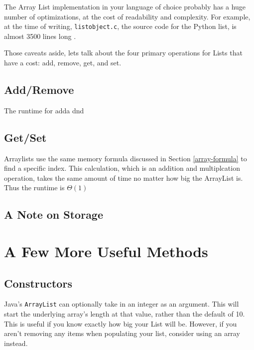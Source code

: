 The Array List implementation in your language of choice probably has a huge number of optimizations, at the cost of readability and complexity.  For example, at the time of writing, \texttt{listobject.c}, the source code for the Python list, is almost 3500 lines long \cite{py-list-source}.

Those caveats aside, lets talk about the four primary operations for Lists that have a cost: add, remove, get, and set.


\subsection{Add/Remove}

The runtime for adda dnd 



\subsection{Get/Set}

Arraylists use the same memory formula discussed in Section \ref{array-formula} to find a specific index.  This calculation, which is an addition and multiplcation operation, takes the same amount of time no matter how big the ArrayList is.  Thus the runtime is $\Theta(1)$



\subsection{A Note on Storage}

\section{A Few More Useful Methods}

\subsection{Constructors}
Java's \texttt{ArrayList} can optionally take in an integer as an argument.
This will start the underlying array's length at that value, rather than the default of 10.
This is useful if you know exactly how big your List will be.  
However, if you aren't removing any items when populating your list, consider using an array instead.

